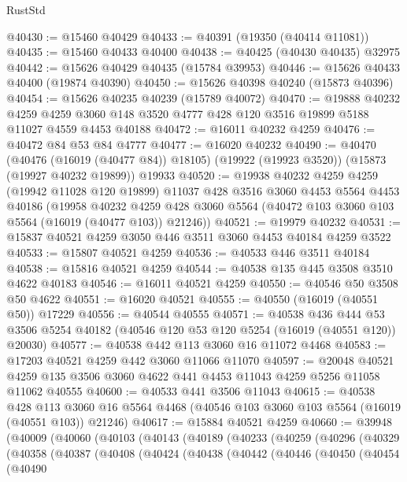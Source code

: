 \begin{lexlean}{RustStd}
\begin{coremodule}
@40430 := @15460 @40429
@40433 := @40391 (@19350 (@40414 @11081))
@40435 := @15460 @40433 @40400
@40438 := @40425 (@40430 @40435) @32975
@40442 := @15626 @40429 @40435 (@15784 @39953)
@40446 := @15626 @40433 @40400 (@19874 @40390)
@40450 := @15626 @40398 @40240 (@15873 @40396)
@40454 := @15626 @40235 @40239 (@15789 @40072)
@40470 := @19888
    @40232
    @4259
    @4259
    @3060
    @148
    @3520
    @4777
    @428
    @120
    @3516
    @19899
    @5188
    @11027
    @4559
    @4453
    @40188
@40472 := @16011 @40232 @4259
@40476 := @40472 @84 @53 @84 @4777
@40477 := @16020 @40232
@40490 := @40470
    (@40476 (@16019 (@40477 @84)) @18105)
    (@19922 (@19923 @3520))
    (@15873 (@19927 @40232 @19899))
    @19933
@40520 := @19938
    @40232
    @4259
    @4259
    (@19942 @11028 @120 @19899)
    @11037
    @428
    @3516
    @3060
    @4453
    @5564
    @4453
    @40186
    (@19958
      @40232
      @4259
      @428
      @3060
      @5564
      (@40472 @103 @3060 @103 @5564 (@16019 (@40477 @103)) @21246))
@40521 := @19979 @40232
@40531 := @15837 @40521 @4259 @3050 @446 @3511 @3060 @4453 @40184 @4259 @3522
@40533 := @15807 @40521 @4259
@40536 := @40533 @446 @3511 @40184
@40538 := @15816 @40521 @4259
@40544 := @40538 @135 @445 @3508 @3510 @4622 @40183
@40546 := @16011 @40521 @4259
@40550 := @40546 @50 @3508 @50 @4622
@40551 := @16020 @40521
@40555 := @40550 (@16019 (@40551 @50)) @17229
@40556 := @40544 @40555
@40571 := @40538
    @436
    @444
    @53
    @3506
    @5254
    @40182
    (@40546 @120 @53 @120 @5254 (@16019 (@40551 @120)) @20030)
@40577 := @40538 @442 @113 @3060 @16 @11072 @4468
@40583 := @17203 @40521 @4259 @442 @3060 @11066 @11070
@40597 := @20048
    @40521
    @4259
    @135
    @3506
    @3060
    @4622
    @441
    @4453
    @11043
    @4259
    @5256
    @11058
    @11062
    @40555
@40600 := @40533 @441 @3506 @11043
@40615 := @40538
    @428
    @113
    @3060
    @16
    @5564
    @4468
    (@40546 @103 @3060 @103 @5564 (@16019 (@40551 @103)) @21246)
@40617 := @15884 @40521 @4259
@40660 := @39948
    (@40009
      (@40060
        (@40103
          (@40143
            (@40189
              (@40233
                (@40259
                  (@40296
                    (@40329
                      (@40358
                        (@40387
                          (@40408
                            (@40424
                              (@40438
                                (@40442
                                  (@40446
                                    (@40450
                                      (@40454
                                        (@40490

\end{coremodule}
\end{lexlean}
